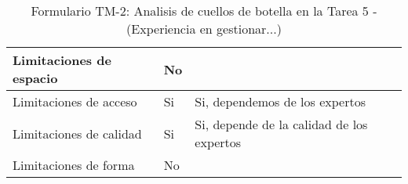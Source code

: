 \begin{table}[H]
{\begin{tabular}{|l|l|l|}
		Limitaciones de espacio& \multicolumn{1}{p{1.0cm}|}{No} & \multicolumn{1}{p{13.0cm}|}{}\\
		\hline

		Limitaciones de acceso& \multicolumn{1}{p{1.0cm}|}{Si} & \multicolumn{1}{p{13.0cm}|}{Si, dependemos de los expertos}\\
		\hline

		Limitaciones de calidad& \multicolumn{1}{p{1.0cm}|}{Si} & \multicolumn{1}{p{13.0cm}|}{Si, depende de la calidad de los expertos}\\
		\hline

		Limitaciones de forma& \multicolumn{1}{p{1.0cm}|}{No} & \multicolumn{1}{p{13.0cm}|}{}\\
		\hline

	  \end{tabular}
	}
	\caption{\label{tab:TM2}Formulario TM-2: Analisis de cuellos de botella en la Tarea 5 - (Experiencia en gestionar...)}
  \end{table}

